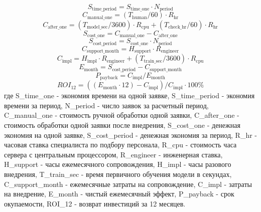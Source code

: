 \begin{equation}
\label{eq:s_time_period-21}
S_{\text{time\_period}} = S_{\text{time\_one}} \cdot N_{\text{period}}
\end{equation}
\begin{equation}
\label{eq:c_manual_one-22}
C_{\text{manual\_one}} = (T_{\text{human}} / 60) \cdot R_{\text{hr}}
\end{equation}
\begin{equation}
\label{eq:c_after_one-23}
C_{\text{after\_one}} = (T_{\text{model\_sec}} / 3600) \cdot R_{\text{cpu}} + (T_{\text{check\_hr}} / 60) \cdot R_{\text{hr}}
\end{equation}
\begin{equation}
\label{eq:s_cost_one-24}
S_{\text{cost\_one}} = C_{\text{manual\_one}} - C_{\text{after\_one}}
\end{equation}
\begin{equation}
\label{eq:s_cost_period-25}
S_{\text{cost\_period}} = S_{\text{cost\_one}} \cdot N_{\text{period}}
\end{equation}
\begin{equation}
\label{eq:c_support_month-26}
C_{\text{support\_month}} = H_{\text{support}} \cdot R_{\text{engineer}}
\end{equation}
\begin{equation}
\label{eq:c_impl-27}
C_{\text{impl}} = H_{\text{impl}} \cdot R_{\text{engineer}} + (T_{\text{train\_sec}} / 3600) \cdot R_{\text{cpu}}
\end{equation}
\begin{equation}
\label{eq:e_month-28}
E_{\text{month}} = S_{\text{cost\_period}} - C_{\text{support\_month}}
\end{equation}
\begin{equation}
\label{eq:p_payback-29}
P_{\text{payback}} = C_{\text{impl}} / E_{\text{month}}
\end{equation}
\begin{equation}
\label{eq:roi_12-30}
ROI_{12} = ((E_{\text{month}} \cdot 12) - C_{\text{impl}}) / C_{\text{impl}} \cdot 100 \%
\end{equation}
где S\_time\_one - экономия времени на одной заявке, S\_time\_period - экономия времени за период, N\_period - число заявок за расчетный период, C\_manual\_one - стоимость ручной обработки одной заявки, C\_after\_one - стоимость обработки одной заявки после внедрения, S\_cost\_one - денежная экономия на одной заявке, S\_cost\_period - денежная экономия за период, R\_hr - часовая ставка специалиста по подбору персонала, R\_cpu - стоимость часа сервера с центральным процессором, R\_engineer - инженерная ставка, H\_support - часы ежемесячного сопровождения, H\_impl - часы разового внедрения, T\_train\_sec - время первичного обучения модели в секундах, C\_support\_month - ежемесячные затраты на сопровождение, C\_impl - затраты на внедрение, E\_month - чистый ежемесячный эффект, P\_payback - срок окупаемости, ROI\_12 - возврат инвестиций за 12 месяцев.\par
